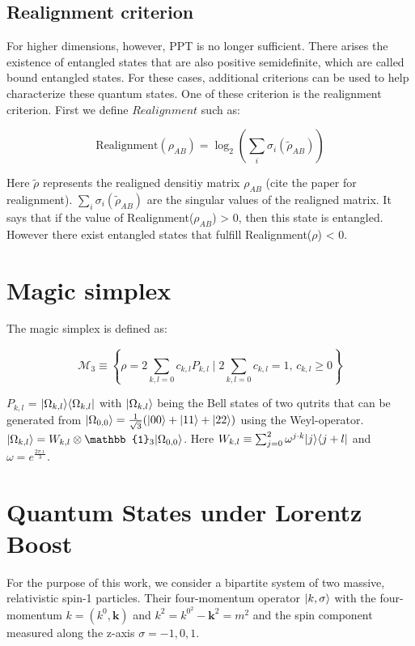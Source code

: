 \subsection{Realignment criterion}

For higher dimensions, however, PPT is no longer sufficient. There arises the existence of entangled states that are also positive semidefinite, which are called bound entangled states.
For these cases, additional criterions can be used to help characterize these quantum states. One of these criterion is the realignment criterion. First we define $Realignment$ such as:


\begin{equation}
    \text{Realignment}(\rho_{AB}) = \log_2({\sum_{i}\sigma_i(\tilde{\rho}_{AB})})
\end{equation}

Here $\tilde{\rho}$ represents the realigned densitiy matrix $\rho_{AB}$ (cite the paper for realignment). $\sum_i\sigma_i(\tilde{\rho}_{AB})$ are the singular values of the realigned matrix.
It says that if the value of Realignment($\rho_{AB}$) > 0, then this state is entangled. However there exist entangled states that fulfill Realignment($\rho$) < 0.

\section{Magic simplex}

The magic simplex is defined as:

\begin{equation}
    \mathcal{M}_3 \equiv \left\{\rho = 2 \sum_{k,l=0} c_{k,l} P_{k,l} \mid 2 \sum_{k,l=0} c_{k,l} = 1, \, c_{k,l} \geq 0\right\}
\end{equation}

$P_{k,l}$ = $\lvert\Omega_{k,l}\rangle\langle\Omega_{k,l}\rvert$ with $\lvert\Omega_{k,l}\rangle$ being the Bell states of two qutrits that can be generated from $\lvert\Omega_{0,0}\rangle = \frac{1}{\sqrt{3}}(\lvert00\rangle + \lvert11\rangle + \lvert22\rangle)$ 
using the Weyl-operator. $\ket{\Omega_{k,l}} = W_{k,l} \otimes \mathbb{1}_3 \ket{\Omega_{0,0}}$. Here $W_{k,l} \equiv \sum_{j=0}^{2}\omega^{j\cdot k}\lvert j\rangle\langle j+l\rvert$ and $\omega = e^{\frac{2\pi\imath}{3}}$.

\section{Quantum States under Lorentz Boost}

For the purpose of this work, we consider a bipartite system of two massive, relativistic spin-1 particles. Their four-momentum operator $\lvert k,\sigma\rangle$ with the four-momentum $k = (k^0,\textbf{k})$ and $k^2 = k^0^2 - \textbf{k}^2 = m^2$ 
and the spin component measured along the z-axis $\sigma = -1,0,1$.

